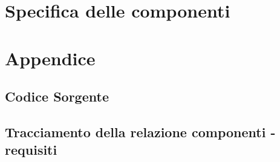 \documentclass[11pt,titlepage,a4paper]{report}
\begin{document}
\chapter{Specifica delle componenti}
\chapter{Appendice}
\section{Codice Sorgente}
\section{Tracciamento della relazione componenti - requisiti}
\newpage

\tableofcontents
\end{document}
